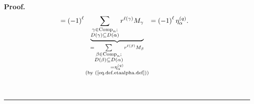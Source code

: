 \documentclass[numbers=enddot,12pt,final,onecolumn,notitlepage]{scrartcl}%
\theoremstyle{definition}
\newenvironment{proof}[1][Proof]{\noindent\textbf{#1.} }{\ \rule{0.5em}{0.5em}}
\let\sumnonlimits\sum
\renewcommand{\sum}{\sumnonlimits\limits}
\newenvironment{vershort}{}{}
\begin{document}
\begin{proof}
\begin{vershort}
\begin{align*}
&  =\left(  -1\right)  ^{\ell}\underbrace{\sum_{\substack{\gamma
\in\operatorname*{Comp}\nolimits_{n};\\D\left(  \gamma\right)  \subseteq
D\left(  \alpha\right)  }}r^{\ell\left(  \gamma\right)  }M_{\gamma}%
}_{\substack{=\sum_{\substack{\beta\in\operatorname*{Comp}\nolimits_{n}%
;\\D\left(  \beta\right)  \subseteq D\left(  \alpha\right)  }}r^{\ell\left(
\beta\right)  }M_{\beta}\\=\eta_{\alpha}^{\left(  q\right)  }\\\text{(by
(\ref{eq.def.etaalpha.def}))}}}=\left(  -1\right)  ^{\ell}\eta_{\alpha
}^{\left(  q\right)  }.
\end{align*}

\end{vershort}


\end{proof}
\end{document}
